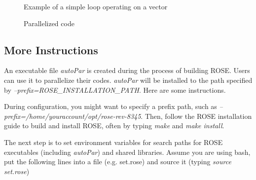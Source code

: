 \lstset{language=C,basicstyle=\scriptsize,numbers=left}
\begin{figure}[htbp]
{\indent
  {\mySmallFontSize
    \begin{latexonly}
    
    \end{latexonly}
    \begin{htmlonly}
    
    \end{htmlonly}
  }
}
\caption{Example of a simple loop operating on a vector}
\label{Manual:autopar:doall_vector2}
\end{figure}

\begin{figure}[htbp]
{\indent
  {\mySmallFontSize
    \begin{latexonly}
    
    \end{latexonly}
    \begin{htmlonly}
    
    \end{htmlonly}
  }
}
\caption{Parallelized code}
\label{Manual:autopar:doall_vector2-trans}
\end{figure}

\subsection{More Instructions}
An executable file \textit{autoPar} is created during the process of
building ROSE.  Users can use it to parallelize their codes.
\textit{autoPar} will be installed to the path specified by
\textit{--prefix=ROSE\_INSTALLATION\_PATH}. 
Here are some instructions.

During configuration, you might want to specify a prefix path, such as
\textit{--prefix=/home/youraccount/opt/rose-rev-8345}.
Then, follow the ROSE installation guide to build and install ROSE,
often by typing \textit{make} and \textit{make install}. 

The next step is to set environment variables for search paths for ROSE executables (including
\textit{autoPar}) and shared libraries. Assume you are using bash, put the
following lines into a file (e.g. set.rose) and source it (typing
\textit{source set.rose})

